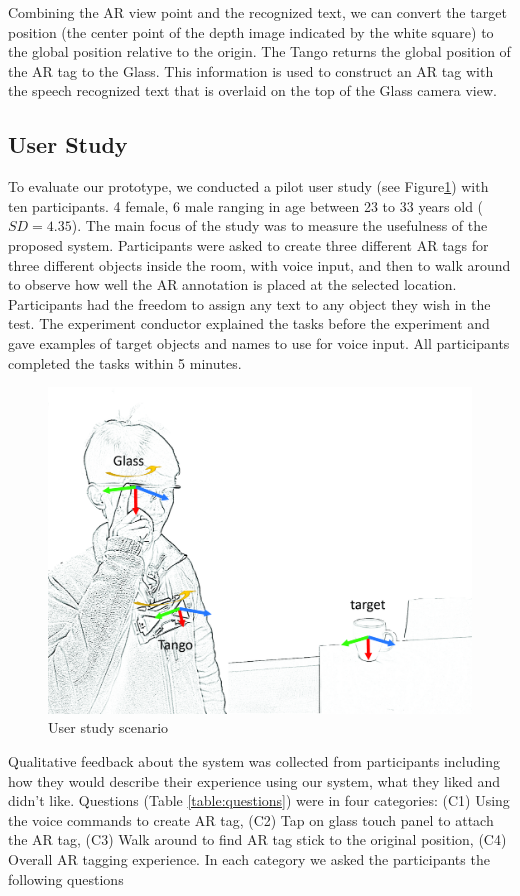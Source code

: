 Combining the AR view point and the recognized text, we can convert the target position (the center point of the depth image indicated by the white square) to the global position relative to the origin. The Tango returns the global position of the AR tag to the Glass. This information is used to construct an AR tag with the speech recognized text that is overlaid on the top of the Glass camera view.


\subsection{User Study}

To evaluate our prototype, we conducted a pilot user study (see Figure\ref{fig:mgia15:scenario}) with ten participants. 4 female, 6 male ranging in age between 23 to 33 years old ($SD= 4.35$). The main focus of the study was to measure the usefulness of the proposed system. Participants were asked to create three different AR tags for three different objects inside the room, with voice input, and then to walk around to observe how well the AR annotation is placed at the selected location. Participants had the freedom to assign any text to any object they wish in the test. The experiment conductor explained the tasks before the experiment and gave examples of target objects and names to use for voice input. All participants completed the tasks within 5 minutes. 

\begin{figure}[ht]
  \centering
  \includegraphics[width=.8\linewidth]{images/mgia15/axis_lo.jpg}
  \caption{User study scenario}
  \label{fig:mgia15:scenario}
\end{figure}

Qualitative feedback about the system was collected from participants including how they would describe their experience using our system, what they liked and didn't like. Questions (Table \ref{table:questions}) were in four categories: (C1) Using the voice commands to create AR tag, (C2) Tap on glass touch panel to attach the AR tag, (C3)  Walk around to find AR tag stick to the original position, (C4) Overall AR tagging experience. In each category we asked the participants the following questions

